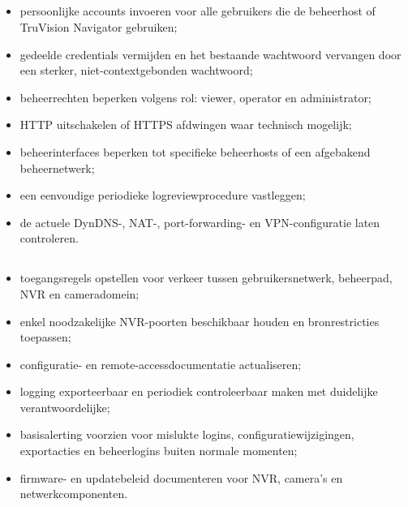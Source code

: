 \subsection{}%
\label{app:quick-wins}

\begin{itemize}
    \item persoonlijke accounts invoeren voor alle gebruikers die de beheerhost of TruVision Navigator gebruiken;
    \item gedeelde credentials vermijden en het bestaande wachtwoord vervangen door een sterker, niet-contextgebonden wachtwoord;
    \item beheerrechten beperken volgens rol: viewer, operator en administrator;
    \item HTTP uitschakelen of HTTPS afdwingen waar technisch mogelijk;
    \item beheerinterfaces beperken tot specifieke beheerhosts of een afgebakend beheernetwerk;
    \item een eenvoudige periodieke logreviewprocedure vastleggen;
    \item de actuele DynDNS-, NAT-, port-forwarding- en VPN-configuratie laten controleren.
\end{itemize}

\subsection{}%
\label{app:middellange-termijn}

\begin{itemize}
    \item toegangsregels opstellen voor verkeer tussen gebruikersnetwerk, beheerpad, NVR en cameradomein;
    \item enkel noodzakelijke NVR-poorten beschikbaar houden en bronrestricties toepassen;
    \item configuratie- en remote-accessdocumentatie actualiseren;
    \item logging exporteerbaar en periodiek controleerbaar maken met duidelijke verantwoordelijke;
    \item basisalerting voorzien voor mislukte logins, configuratiewijzigingen, exportacties en beheerlogins buiten normale momenten;
    \item firmware- en updatebeleid documenteren voor NVR, camera's en netwerkcomponenten.
\end{itemize}

